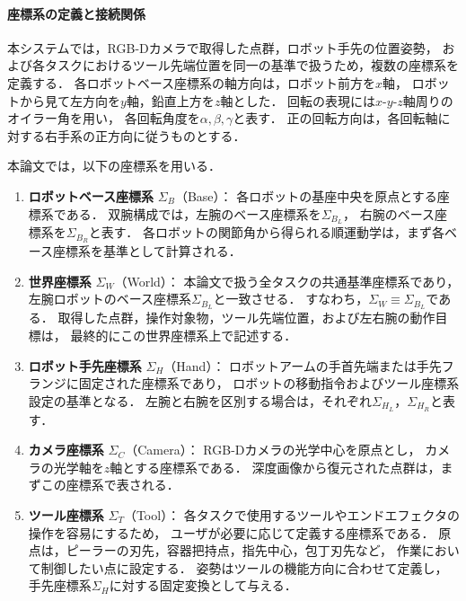 \paragraph{座標系の定義と接続関係}
\label{sec:system:hardware:coordinate-system}

本システムでは，RGB-Dカメラで取得した点群，ロボット手先の位置姿勢，
および各タスクにおけるツール先端位置を同一の基準で扱うため，複数の座標系を定義する．
各ロボットベース座標系の軸方向は，ロボット前方を$x$軸，
ロボットから見て左方向を$y$軸，鉛直上方を$z$軸とした．
回転の表現には$x$-$y$-$z$軸周りのオイラー角を用い，
各回転角度を$\alpha,\beta,\gamma$と表す．
正の回転方向は，各回転軸に対する右手系の正方向に従うものとする．

本論文では，以下の座標系を用いる．

\begin{enumerate}
  \item \textbf{ロボットベース座標系} $\Sigma_{B}$（Base）：
  各ロボットの基座中央を原点とする座標系である．
  双腕構成では，左腕のベース座標系を$\Sigma_{B_L}$，
  右腕のベース座標系を$\Sigma_{B_R}$と表す．
  各ロボットの関節角から得られる順運動学は，まず各ベース座標系を基準として計算される．

  \item \textbf{世界座標系} $\Sigma_{W}$（World）：
  本論文で扱う全タスクの共通基準座標系であり，
  左腕ロボットのベース座標系$\Sigma_{B_L}$と一致させる．
  すなわち，$\Sigma_W \equiv \Sigma_{B_L}$である．
  取得した点群，操作対象物，ツール先端位置，および左右腕の動作目標は，
  最終的にこの世界座標系上で記述する．

  \item \textbf{ロボット手先座標系} $\Sigma_{H}$（Hand）：
  ロボットアームの手首先端または手先フランジに固定された座標系であり，
  ロボットの移動指令およびツール座標系設定の基準となる．
  左腕と右腕を区別する場合は，それぞれ$\Sigma_{H_L}$，$\Sigma_{H_R}$と表す．

  \item \textbf{カメラ座標系} $\Sigma_{C}$（Camera）：
  RGB-Dカメラの光学中心を原点とし，
  カメラの光学軸を$z$軸とする座標系である．
  深度画像から復元された点群は，まずこの座標系で表される．

  \item \textbf{ツール座標系} $\Sigma_{T}$（Tool）：
  各タスクで使用するツールやエンドエフェクタの操作を容易にするため，
  ユーザが必要に応じて定義する座標系である．
  原点は，ピーラーの刃先，容器把持点，指先中心，包丁刃先など，
  作業において制御したい点に設定する．
  姿勢はツールの機能方向に合わせて定義し，
  手先座標系$\Sigma_H$に対する固定変換として与える．
\end{enumerate}

